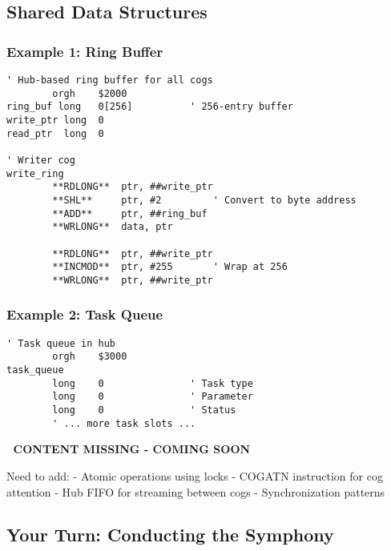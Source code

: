 \documentclass[11pt]{book}
\begin{document}
\hypertarget{shared-data-structures}{%
\subsection{Shared Data Structures}\label{shared-data-structures}}

\hypertarget{example-1-ring-buffer}{%
\subsubsection{Example 1: Ring Buffer}\label{example-1-ring-buffer}}

\begin{lstlisting}
' Hub-based ring buffer for all cogs
        orgh    $2000
ring_buf long   0[256]          ' 256-entry buffer
write_ptr long  0
read_ptr  long  0

' Writer cog
write_ring
        **RDLONG**  ptr, ##write_ptr
        **SHL**     ptr, #2         ' Convert to byte address
        **ADD**     ptr, ##ring_buf
        **WRLONG**  data, ptr
        
        **RDLONG**  ptr, ##write_ptr
        **INCMOD**  ptr, #255       ' Wrap at 256
        **WRLONG**  ptr, ##write_ptr
\end{lstlisting}

\hypertarget{example-2-task-queue}{%
\subsubsection{Example 2: Task Queue}\label{example-2-task-queue}}

\begin{lstlisting}
' Task queue in hub
        orgh    $3000
task_queue
        long    0               ' Task type
        long    0               ' Parameter
        long    0               ' Status
        ' ... more task slots ...
\end{lstlisting}

\begin{missing}
🚧 \textbf{CONTENT MISSING - COMING SOON}

Need to add:
- Atomic operations using locks
- COGATN instruction for cog attention
- Hub FIFO for streaming between cogs
- Synchronization patterns
\end{missing}

\hypertarget{your-turn-conducting-the-symphony}{%
\subsection{Your Turn: Conducting the
Symphony}\label{your-turn-conducting-the-symphony}}
\end{document}
